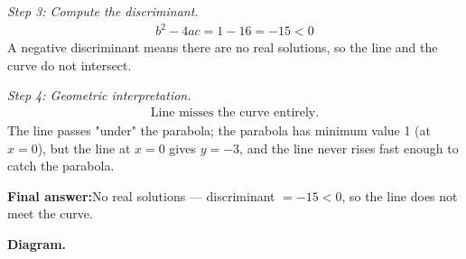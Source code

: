 \documentclass[11pt]{article}
\begin{document}
\textit{Step 3: Compute the discriminant.}
\[\begin{gathered}
b^2 - 4ac = 1 - 16 = -15 < 0
\end{gathered}\]
A negative discriminant means there are no real solutions, so the line and the curve do not intersect.

\textit{Step 4: Geometric interpretation.}
\[\begin{gathered}
\text{Line misses the curve entirely.}
\end{gathered}\]
The line passes "under" the parabola; the parabola has minimum value 1 (at \( x = 0 \)), but the line at \( x = 0 \) gives \( y = -3 \), and the line never rises fast enough to catch the parabola.

\begin{answerbox}
\textbf{Final answer:}\quad No real solutions --- discriminant \(\displaystyle = -15 < 0\), so the line does not meet the curve.
\end{answerbox}
\textbf{Diagram.}
\end{document}
